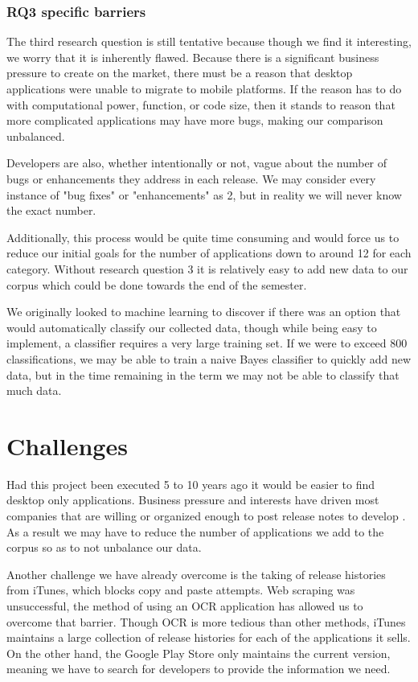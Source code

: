 \documentclass{acm_proc_article-sp}
\begin{document}
\subsubsection{RQ3 specific barriers}
The third research question is still tentative because though we find it interesting, we worry that it is inherently flawed.
Because there is a significant business pressure to create \sibs on the market, there must be a reason that desktop applications were unable to migrate to mobile platforms. 
If the reason has to do with computational power, function, or code size, then it stands to reason that more complicated applications may have more bugs, making our comparison unbalanced.

Developers are also, whether intentionally or not, vague about the number of bugs or enhancements they address in each release. 
We may consider every instance of "bug fixes" or "enhancements" as 2, but in reality we will never know the exact number.

Additionally, this process would be quite time consuming and would force us to reduce our initial goals for the number of applications down to around 12 for each category.
Without research question 3 it is relatively easy to add new data to our corpus which could be done towards the end of the semester.

We originally looked to machine learning to discover if there was an option that would automatically classify our collected data, though while being easy to implement, a classifier requires a very large training set.
If we were to exceed 800 classifications, we may be able to train a naive Bayes classifier to quickly add new data, but in the time remaining in the term we may not be able to classify that much data.

\section{Challenges}
Had this project been executed 5 to 10 years ago it would be easier to find desktop only applications. 
Business pressure and interests have driven most companies that are willing or organized enough to post release notes to develop \sibs. 
As a result we may have to reduce the number of applications we add to the corpus so as to not unbalance our data.

Another challenge we have already overcome is the taking of release histories from iTunes, which blocks copy and paste attempts. 
Web scraping was unsuccessful, the method of using an OCR application has allowed us to overcome that barrier.
Though OCR is more tedious than other methods,  iTunes maintains a large collection of release histories for each of the applications it sells.
On the other hand, the Google Play Store only maintains the current version, meaning we have to search for developers to provide the information we need.
\end{document}

